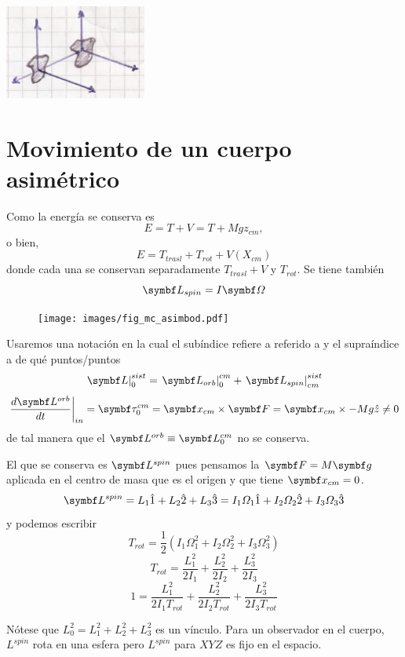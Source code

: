 \documentclass[10pt,oneside]{CBFT_book}
\begin{document}
\includegraphics[width=0.35\textwidth]{images/fig_mc_steiner_4.jpg}

\section{Movimiento de un cuerpo asimétrico}

Como la energía se conserva es
\[
	E = T + V = T + M g z_{cm},
\]
o bien, 
\[
	E = T_{trasl} + T_{rot} + V(X_{cm})
\]
donde cada una se conservan separadamente $T_{trasl}+V$ y $T_{rot}$. Se tiene también 
\[
	\vb{L}_{spin} = I \vb{\Omega}
\]

\begin{figure}[htb]
	\begin{center}
	\texttt{[image: images/fig\_mc\_asimbod.pdf]}	 
	\end{center}
	\caption{}
\end{figure} 

Usaremos una notación en la cual el subíndice refiere a referido a y el supraíndice a de qué puntos/puntos
\[
	\left.\vb{L}\right|_{0}^{sist} = \left.\vb{L}_{orb}\right|_{0}^{cm} + \left.\vb{L}_{spin}\right|_{cm}^{sist}  
\]
\[
	\left.\frac{d\vb{L}^{orb}}{dt}\right|_{in} = 
	\vb{\tau}_0^{cm} = \vb{x}_{cm} \times \vb{F} = \vb{x}_{cm} \times - M g \hat{z} \neq 0
\]
de tal manera que el $\vb{L}^{orb} \equiv \vb{L}_0^{cm}$ no se conserva.

El que se conserva es $\vb{L}^{spin}$ pues pensamos la $\vb{F}=M\vb{g}$ aplicada en el centro de masa que es el origen
y que tiene $\vb{x}_{cm}=0$.
\[
	\vb{L}^{spin} = L_1 \hat{1} + L_2 \hat{2} + L_3 \hat{3} = I_1\Omega_1 \hat{1} + I_2\Omega_2 \hat{2} + I_3\Omega_3 \hat{3}
\]
y podemos escribir
\[
	T_{rot} = \frac{1}{2} \left( I_1\Omega_1^2 + I_2\Omega_2^2 + I_3\Omega_3^2 \right)
\]
\[
	T_{rot} = \frac{L_1^2}{2 I_1} + \frac{L_2^2}{2 I_2} + \frac{L_3^2}{2 I_3}
\]
\[
	1  = \frac{L_1^2}{2 I_1 T_{rot}} + \frac{L_2^2}{2 I_2 T_{rot}} + \frac{L_3^2}{2 I_3 T_{rot}}
\]

Nótese que $L_0^2 = L_1^2 + L_2^2 + L_3^2 $ es un vínculo. Para un observador en el cuerpo, $L^{spin}$ rota en 
una esfera pero $L^{spin}$ para $XYZ$ es fijo en el espacio.
\end{document}
